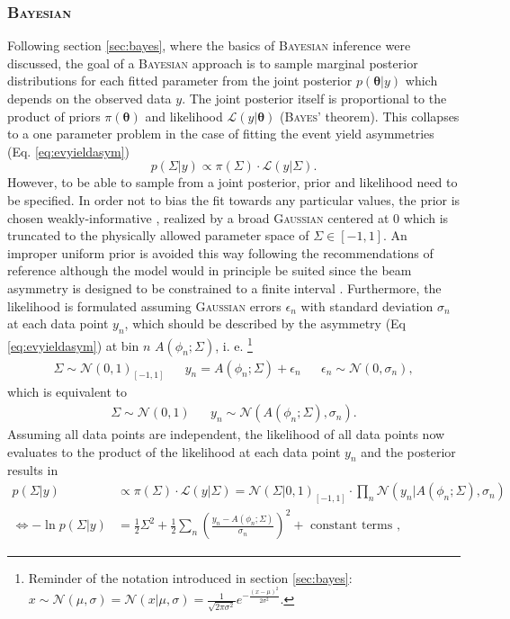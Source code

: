 \subsubsection{\textsc{Bayesian}}
Following section \ref{sec:bayes}, where the basics of \textsc{Bayesian} inference were discussed, the goal of a \textsc{Bayesian} approach is to sample marginal posterior distributions for each fitted parameter from the joint posterior $p(\boldsymbol{\theta}|y)$ which depends on the observed data $y$. The joint posterior itself is proportional to the product of priors $\pi(\boldsymbol{\theta})$ and likelihood $\mathcal{L}(y|\boldsymbol{\theta})$ (\textsc{Bayes'} theorem). This collapses to a one parameter problem in the case of fitting the event yield asymmetries (Eq. \eqref{eq:evyieldasym})
\begin{equation}
	p(\Sigma|y)\propto \pi({\Sigma})\cdot \mathcal{L}(y|\Sigma).
\end{equation}
However, to be able to sample from a joint posterior, prior and likelihood need to be specified. In order not to bias the fit towards any particular values, the prior is chosen weakly-informative \cite{bayes}, realized by a broad \textsc{Gaussian} centered at 0 which is truncated to the physically allowed parameter space of $\Sigma\in[-1,1]$. An improper uniform prior is avoided this way following the recommendations of reference \cite{standevs} although the model would in principle be suited since the beam asymmetry is designed to be constrained to a finite interval \cite{standevs}. Furthermore, the likelihood is formulated assuming \textsc{Gaussian} errors $\epsilon_n$ with standard deviation $\sigma_n$ at each data point $y_n$, which should be described by the asymmetry (Eq \eqref{eq:evyieldasym}) at bin $n$ $A(\phi_n;\Sigma)$, i. e. \footnote{Reminder of the notation introduced in section \ref{sec:bayes}: $x\sim\mathcal{N}(\mu,\sigma)=\mathcal{N}(x|\mu,\sigma)=\frac{1}{\sqrt{2\pi\sigma^2}}e^{-\frac{(x-\mu)^2}{2\sigma^2}}$.}
\begin{align}
	\Sigma \sim \mathcal{N}\left(0,1\right)_{[-1,1]} && y_n=A\left(\phi_n;\Sigma\right)+\epsilon_n && \epsilon_n\sim\mathcal{N}\left(0,\sigma_n\right),
\end{align}
which is equivalent to
\begin{align}
	 \Sigma \sim \mathcal{N}(0,1) &&y_n\sim\mathcal{N}\left(A(\phi_n;\Sigma),\sigma_n\right).
\end{align}
Assuming all data points are independent, the likelihood of all data points now evaluates to the product of the likelihood at each data point $y_n$ and the posterior results in \begin{align}
	p(\Sigma|y)&\propto\pi(\Sigma)\cdot\mathcal{L}(y|\Sigma)=\mathcal{N}\left(\Sigma|0,1\right)_{[-1,1]}\cdot\prod_{n}\mathcal{N}\left(y_n|A\left(\phi_n;\Sigma\right),\sigma_n\right)\\
	\Leftrightarrow -\ln p(\Sigma|y)&=\frac{1}{2}\Sigma^2+\frac{1}{2}\sum_{n}\left(\frac{y_n-A\left(\phi_n;\Sigma\right)}{\sigma_n}\right)^2+\text{ constant terms }, 
\end{align}
